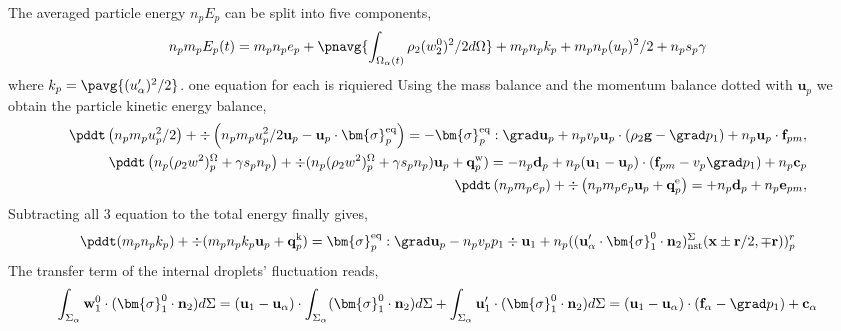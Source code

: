 The averaged particle energy $n_p E_p$ can be split into five components,
\begin{equation*}
    n_p m_p E_p(t) 
    = m_p n_p e_p 
    + \pnavg{\int_{\Omega_\alpha(t)} \rho_2  (w_2^0)^2/2 d\Omega}
    + m_p n_p k_p
    + m_p n_p (u_p)^2/2
    + n_p s_p \gamma
\end{equation*}
where $k_p = \pavg{(u_\alpha')^2/2}$.
one equation for each is riquiered 
Using the mass balance and the momentum balance dotted with $\textbf{u}_p$ we obtain the particle kinetic energy balance, 
\begin{align*}
    \pddt \left(n_p m_p u_p^2/ 2\right)
    + \div \left(n_p
    m_p u_p^2/ 2 \textbf{u}_p 
    - \textbf{u}_p \cdot \bm{\sigma}_p^\text{eq}
    \right)
    = 
    - \bm{\sigma}_p^\text{eq}  :\grad \textbf{u}_p
    +  n_p v_p \textbf{u}_p \cdot (
    \rho_2 \textbf{g}
    - \grad p_1 )
    + n_p \textbf{u}_p \cdot \textbf{f}_{pm},\\
    \pddt \left(n_p (\rho_2 w^2 )_p^\Omega+\gamma s_p n_p\right)
    + \div 
    (n_p (\rho_2 w^2 )_p^\Omega+\gamma s_p n_p)
    \textbf{u}_p 
    +  \textbf{q}_p^\text{w}
    )
    = 
    - n_p \textbf{d}_p
    +  n_p (\textbf{u}_1 -\textbf{u}_p) \cdot  (\textbf{f}_{pm} - v_p \grad p_1)
    + n_p\textbf{c}_p\\
    \pddt \left(n_p m_p e_p\right)
    + \div \left(n_p
    m_p e_p \textbf{u}_p 
    +  \textbf{q}_p^\text{e}
    \right)
    = 
    + n_p \textbf{d}_p
    + n_p \textbf{e}_{pm},\\
\end{align*}
Subtracting all 3 equation to the total energy finally gives, 
\begin{align*}
    \pddt(m_p n_pk_p)
    + \div(m_pn_p k_p \textbf{u}_p 
    + \textbf{q}_p^\text{k})
    = 
    \bm{\sigma}_p^\text{eq} : \grad \textbf{u}_p
    - n_p v_p p_1 \div \textbf{u}_1
    + n_p (( \textbf{u}_\alpha' \cdot \bm{\sigma}_1^0 \cdot \textbf{n}_2)^\Sigma_\text{nst}(\textbf{x}\pm\textbf{r}/2,\mp\textbf{r}) )_p^r \\
\end{align*}
The transfer term of the internal droplets' fluctuation reads, 
\begin{align*}
    \int_{\Sigma_\alpha} \textbf{w}_1^0 \cdot (\bm{\sigma}_1^0 \cdot \textbf{n}_2) d\Sigma  
    = 
    (\textbf{u}_1 -\textbf{u}_\alpha) \cdot \int_{\Sigma_\alpha}  (\bm{\sigma}_1^0 \cdot \textbf{n}_2) d\Sigma  
    + \int_{\Sigma_\alpha} \textbf{u}_1' \cdot (\bm{\sigma}_1^0 \cdot \textbf{n}_2) d\Sigma  
    = (\textbf{u}_1 -\textbf{u}_\alpha) \cdot  (\textbf{f}_\alpha - \grad p_1)
    + \textbf{c}_\alpha
\end{align*}
